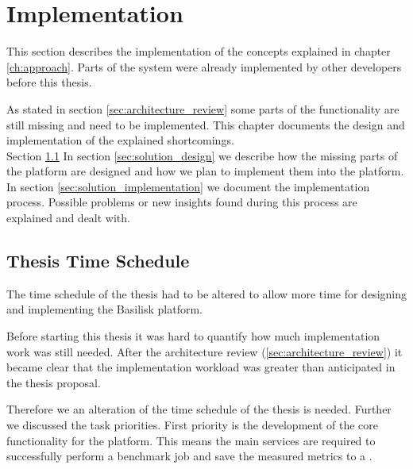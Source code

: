 \chapter{Implementation}
\label{ch:implementation}



This section describes the implementation of the concepts explained in chapter \ref{ch:approach}.
Parts of the system were already implemented by other developers before this thesis.

As stated in section \ref{sec:architecture_review} some parts of the functionality are still missing and need to be implemented.
This chapter documents the design and implementation of the explained shortcomings.
\\

Section \ref{sec:time_schedule}
In section \ref{sec:solution_design} we describe how the missing parts of the platform are designed and how we plan to implement them into the platform.
In section \ref{sec:solution_implementation} we document the implementation process.
Possible problems or new insights found during this process are explained and dealt with.






\section{Thesis Time Schedule}
\label{sec:time_schedule}
The time schedule of the thesis had to be altered to allow more time for designing and implementing the Basilisk platform.

Before starting this thesis it was hard to quantify how much implementation work was still needed.
After the architecture review (\ref{sec:architecture_review}) it became clear that the implementation workload was greater than anticipated in the thesis proposal.

Therefore we an alteration of the time schedule of the thesis is needed.
Further we discussed the task priorities.
First priority is the development of the core functionality for the platform.
This means the main services are required to successfully perform a benchmark job and save the measured metrics to a \ts{}.

